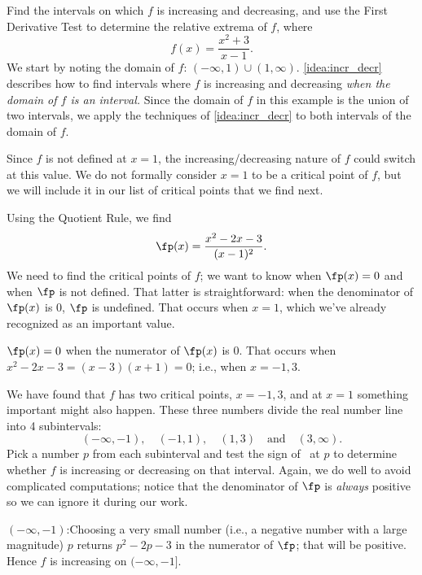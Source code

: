 \begin{example}\label{ex_incr2}
Find the intervals on which $f$ is increasing and decreasing, and use the First Derivative Test to determine the relative extrema of $f$,  where
\[f(x) = \frac{x^2+3}{x-1}.\]
\solution
We start by noting the domain of $f$: $(-\infty,1)\cup(1,\infty)$. \autoref{idea:incr_decr} describes how to find intervals where $f$ is increasing and decreasing \emph{when the domain of $f$ is an interval.} Since the domain of $f$ in this example is the union of two intervals, we apply the techniques of \autoref{idea:incr_decr} to both intervals of the domain of $f$.

Since $f$ is not defined at $x=1$, the increasing/decreasing nature of $f$ could switch at this value. We do not formally consider $x=1$ to be a critical point of $f$, but we will include it in our list of critical points that we find next.

Using the Quotient Rule, we find
\[\fp(x) = \frac{x^2-2x-3}{(x-1)^2}.\]
We need to find the critical points of $f$; we want to know when $\fp(x)=0$ and when $\fp$ is not defined. That latter is straightforward: when the denominator of $\fp(x)$ is 0, $\fp$ is undefined. That occurs when $x=1$, which we've already recognized as an important value.


$\fp(x)=0$ when the numerator of $\fp(x)$ is 0. That occurs when $x^2-2x-3 = (x-3)(x+1) = 0$; i.e., when $x=-1,3$. 

We have found that $f$ has two critical points, $x=-1,3$, and at $x=1$ something important might also happen. These three numbers divide the real number line into 4 subintervals:
\[(-\infty,-1), \quad (-1, 1), \quad (1,3) \quad \text{and} \quad (3,\infty).\]
Pick a number $p$ from each subinterval and test the sign of \fp\ at $p$ to determine whether $f$ is increasing or decreasing on that interval. Again, we do well to avoid complicated computations; notice that the denominator of $\fp$ is \emph{always} positive so we can ignore it during our work.

\iflatexml\begin{description}\else\begin{description}[leftmargin=0pt]\fi
\item[Interval 1,] $(-\infty,-1)$:\quad  Choosing a very small number (i.e., a negative number with a large magnitude) $p$ returns $p^2-2p-3$ in the numerator of $\fp$; that will be positive. Hence $f$ is increasing on $(-\infty,-1]$.


\end{description}
\end{description}
\end{example}
